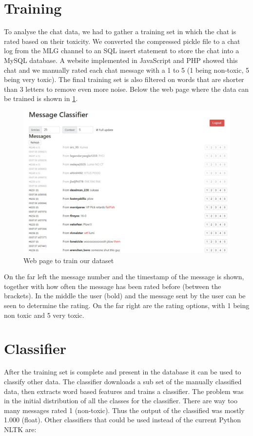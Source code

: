 \documentclass[final]{report}
\begin{document}
\section{Training}
To analyse the chat data, we had to gather a training set in which the chat is rated based on their toxicity.
We converted the compressed pickle file to a chat log from the MLG channel to an SQL insert statement to store the chat into a MySQL database.
A website implemented in JavaScript and PHP showed this chat and we manually rated each chat message with a 1 to 5 (1 being non-toxic, 5 being very toxic). The final training set is also filtered on words that are shorter than 3 letters to remove even more noise. Below the web page where the data can be trained is shown in \ref{fig:rating}.

\begin{figure}[h]
\includegraphics[scale=0.5]{rating}
\caption{Web page to train our dataset}
\label{fig:rating}
\end{figure}

On the far left the message number and the timestamp of the message is shown, together with how often the message has been rated before (between the brackets). In the middle the user (bold) and the message sent by the user can be seen to determine the rating. On the far right are the rating options, with 1 being non toxic and 5 very toxic.

\clearpage

\section{Classifier}

After the training set is complete and present in the database it can be used to classify other data. The classifier downloads a sub set of the manually classified data, then extracts word based features and trains a classifier.
The problem was in the initial distribution of all the classes for the classifier.
There are way too many messages rated 1 (non-toxic). Thus the output of the classified was mostly 1.000 (float). Other classifiers that could be used instead of the current Python NLTK are:
\end{document}

